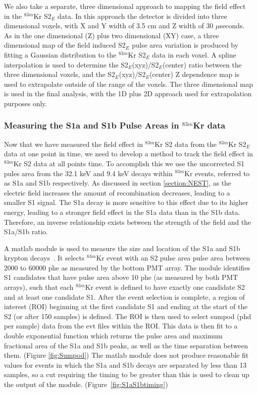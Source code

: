 We also take a separate, three dimensional approach to mapping the field effect in the $^{83m}$Kr S2$_E$ data. In this approach the detector is divided into three dimensional voxels, with X and Y width of 3.5 cm and Z width of 30 $\mu$seconds.  As in the one dimensional (Z) plus two dimensional (XY) case, a three dimensional map of the field induced S2$_E$ pulse area variation is produced by fitting a Gaussian distribution to the $^{83m}$Kr S2$_E$ data in each voxel.  A spline interpolation is used to determine the S2$_E$(xyz)/S2$_E$(center) ratio between the three dimensional voxels, and the S2$_E$(xyz)/S2$_E$(center) Z dependence map is used to extrapolate outside of the range of the voxels.  The three dimensional map is used in the final analysis, with the 1D plus 2D approach used for extrapolation purposes only.

\subsubsection{Measuring the S1a and S1b Pulse Areas in $^{83m}$Kr data} \label{section:S1aS1b1}

Now that we have measured the field effect in $^{83m}$Kr S2 data from the $^{83m}$Kr S2$_E$ data at one point in time, we need to develop a method to track the field effect in $^{83m}$Kr S2 data at all points time.  To accomplish this we use the uncorrected S1 pules area from the 32.1 keV and 9.4 keV decays within $^{83m}$Kr events, referred to as S1a and S1b respectively.  As discussed in section \ref{section:NEST}, as the electric field increases the amount of recombination decreases, leading to a smaller S1 signal.  The S1a decay is more sensitive to this effect due to its higher energy, leading to a stronger field effect in the S1a data than in the S1b data.   Therefore, an inverse relationship exists between the strength of the field and the S1a/S1b ratio.  

A matlab module is used to measure the size and location of the S1a and S1b krypton decays~\cite{S1aS1bModuleNote}. It selects $^{83m}$Kr event with an S2 pulse area pulse area between 2000 to 60000 phe as measured by the bottom PMT array.  The module identifies S1 candidates that have pulse area above 10 phe (as measured by both PMT arrays), such that each $^{83m}$Kr event is defined to have exactly one candidate S2 and at least one candidate S1.  After the event selection is complete, a region of interest (ROI) beginning at the first candidate S1 and ending at the start of the S2 (or after 150 samples) is defined. The ROI is then used to select sumpod (phd per sample) data from the evt files within the ROI.  This data is then fit to a double exponential function which returns the pulse area and maximum fractional area of the S1a and S1b peaks, as well as the time separation between them. (Figure \ref{fig:Sumpod}) The matlab module does not produce reasonable fit values for events in which the S1a and S1b decays are separated by less than 13 samples, so a cut requiring the timing to be greater than this is used to clean up the output of the module.  (Figure~\ref{fig:S1aS1btiming})

